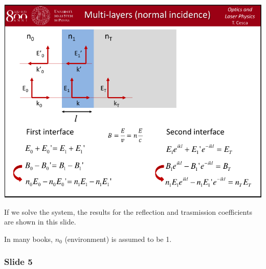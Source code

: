 \documentclass[../main/main.tex]{subfiles}
\begin{document}
\begin{minipage}[]{0.5\linewidth}
\centering
\includegraphics[page=4,width=1\textwidth]{../lessons/pdf_file/06_lecture.pdf}
\end{minipage}
\hspace{0.3cm}\vspace{0.3cm}
\begin{minipage}[c]{0.47\linewidth}

If we solve the system, the results for the reflection and trasmission coefficients are shown in this slide.

In many books, \( n_0 \) (environment) is assumed to be 1.

\end{minipage}

\subsubsection*{Slide 5}
\end{document}
